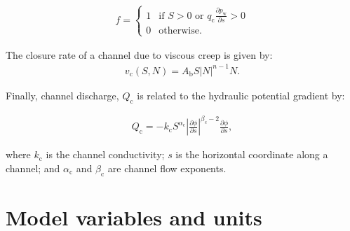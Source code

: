 \documentclass[tc, manuscript]{copernicus}
\begin{document}
\begin{equation}
\label{appeqn: f}
\begin{aligned}
f = 
\begin{cases} 
1 & \text{if } S > 0 \text{ or } q_{\mathrm{c}}\frac{\partial p_{\mathrm{w}}}{\partial s} > 0 \\ 0 &\text{otherwise}.
\end{cases}
\end{aligned}
\end{equation}

The closure rate of a channel due to viscous creep is given by: 
\begin{equation}
\label{appeqn: closure}
\begin{aligned}
v_{\mathrm{c}}\left(S,N\right) = A_{\mathrm{b}}S\left|N\right|^{n-1}N.
\end{aligned}
\end{equation}

Finally, channel discharge, $Q_{\mathrm{c}}$ is related to the hydraulic potential gradient by:

\begin{equation}
\label{appeqn: Qc}
\begin{aligned}
Q_{\mathrm{c}} = -k_{\mathrm{c}}S^{\alpha_{\mathrm{c}}}\left|\frac{\partial \phi}{\partial s}\right|^{\beta_{c}-2}\frac{\partial \phi}{\partial s},
\end{aligned}
\end{equation}

where $k_{\mathrm{c}}$ is the channel conductivity; $s$ is the horizontal coordinate along a channel; and $\alpha_{\mathrm{c}}$ and $\beta_{\mathrm{c}}$ are channel flow exponents.

\newpage
\section{Model variables and units}
\end{document}
